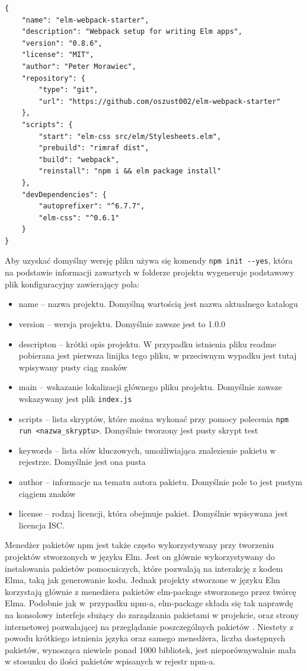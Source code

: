 \begin{minipage}{\linewidth}
\begin{lstlisting}[caption=Przykładowy plik package.json, tabsize=2, label=listing:package]
{
	"name": "elm-webpack-starter",
	"description": "Webpack setup for writing Elm apps",
	"version": "0.8.6",
	"license": "MIT",
	"author": "Peter Morawiec",
	"repository": {
		"type": "git",
		"url": "https://github.com/oszust002/elm-webpack-starter"
	},
	"scripts": {
		"start": "elm-css src/elm/Stylesheets.elm",
		"prebuild": "rimraf dist",
		"build": "webpack",
		"reinstall": "npm i && elm package install"
	},
	"devDependencies": {
		"autoprefixer": "^6.7.7",
		"elm-css": "^0.6.1"
	}
}
\end{lstlisting}
\end{minipage}
Aby uzyskać domyślny wersję pliku używa się komendy \lstinline{npm init --yes}, która na podstawie informacji zawartych w folderze projektu wygeneruje podstawowy plik konfiguracyjny zawierający pola:
\begin{itemize}
	\item name -- nazwa projektu. Domyślną wartością jest nazwa aktualnego katalogu
	\item version -- wersja projektu. Domyślnie zawsze jest to 1.0.0
	\item descripton -- krótki opis projektu. W przypadku istnienia pliku readme pobierana jest pierwsza linijka tego pliku, w przeciwnym wypadku jest tutaj wpisywany pusty ciąg znaków
	\item main -- wskazanie lokalizacji głównego pliku projektu. Domyślnie zawsze wskazywany jest plik \lstinline{index.js}
	\item scripts -- lista skryptów, które można wykonać przy pomocy polecenia \lstinline{npm run <nazwa_skryptu>}. Domyślnie tworzony jest pusty skrypt test
	\item keywords -- lista słów kluczowych, umożliwiająca znalezienie pakietu w rejestrze. Domyślnie jest ona pusta
	\item author -- informacje na tematu autora pakietu. Domyślnie pole to jest pustym ciągiem znaków
	\item license -- rodzaj licencji, która obejmuje pakiet. Domyślnie wpisywana jest licencja ISC.
\end{itemize}

Menedżer pakietów npm jest także często wykorzystywany przy tworzeniu projektów stworzonych w języku Elm. Jest on głównie wykorzystywany do instalowania pakietów pomocniczych, które pozwalają na interakcję z kodem Elma, taką jak generowanie kodu. Jednak projekty stworzone w języku Elm korzystają głównie z menedżera pakietów elm-package stworzonego przez twórcę Elma. Podobnie jak w~przypadku npm-a, elm-package składa się tak naprawdę na konsolowy interfejs służący do zarządzania pakietami w projekcie, oraz strony internetowej pozwalającej na przeglądanie poszczególnych pakietów \cite{elmPackage}. Niestety z powodu krótkiego istnienia języka oraz samego menedżera, liczba dostępnych pakietów, wynosząca niewiele ponad 1000 bibliotek, jest nieporównywalnie mała w stosunku do ilości pakietów wpisanych w rejestr npm-a. 

